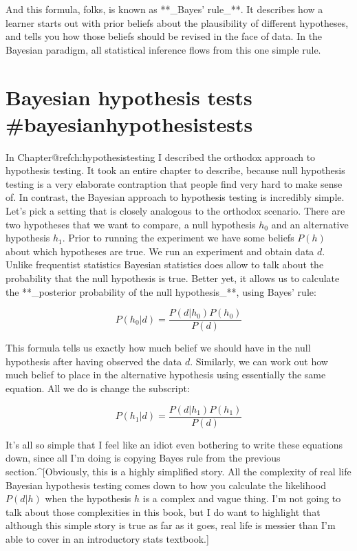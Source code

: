 And this formula, folks, is known as **_Bayes' rule_**. It describes how a learner starts out with prior beliefs about the plausibility of different hypotheses, and tells you how those beliefs should be revised in the face of data. In the Bayesian paradigm, all statistical inference flows from this one simple rule.

\section{Bayesian hypothesis tests {#bayesianhypothesistests}}

In Chapter@refch:hypothesistesting I described the orthodox approach to hypothesis testing. It took an entire chapter to describe, because null hypothesis testing is a very elaborate contraption that people find very hard to make sense of. In contrast, the Bayesian approach to hypothesis testing is incredibly simple. Let's pick a setting that is closely analogous to the orthodox scenario. There are two hypotheses that we want to compare, a null hypothesis $h_0$ and an alternative hypothesis $h_1$. Prior to running the experiment we have some beliefs $P(h)$ about which hypotheses are true. We run an experiment and obtain data $d$. Unlike frequentist statistics Bayesian statistics does allow to talk about the probability that the null hypothesis is true. Better yet, it allows us to calculate the **_posterior probability of the null hypothesis_**, using Bayes' rule:

$$
P(h_0 | d) = \frac{P(d|h_0) P(h_0)}{P(d)}
$$


This formula tells us exactly how much belief we should have in the null hypothesis after having observed the data $d$. Similarly, we can work out how much belief to place in the alternative hypothesis using essentially the same equation. All we do is change the subscript:

$$
P(h_1 | d) = \frac{P(d|h_1) P(h_1)}{P(d)}
$$


It's all so simple that I feel like an idiot even bothering to write these equations down, since all I'm doing is copying Bayes rule from the previous section.^[Obviously, this is a highly simplified story. All the complexity of real life Bayesian hypothesis testing comes down to how you calculate the likelihood $P(d|h)$ when the hypothesis $h$ is a complex and vague thing. I'm not going to talk about those complexities in this book, but I do want to highlight that although this simple story is true as far as it goes, real life is messier than I'm able to cover in an introductory stats textbook.]



